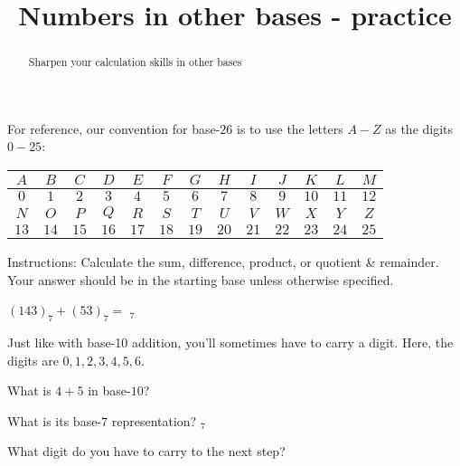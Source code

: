 \documentclass[handout,numbers]{ximera}
\title{Numbers in other bases - practice}
\begin{document}
\begin{abstract} {Sharpen your calculation skills in other bases}
\end{abstract}
\maketitle

For reference, our convention for base-$26$ is to use the letters $A-Z$ as the digits $0-25$:

\begin{center}
\begin{small}
\begin{tabular}{|c|c|c|c|c|c|c|c|c|c|c|c|c|}
\hline
 $A$ & $B$ & $C$ & $D$ & $E$ & $F$ & $G$ & $H$ & $I$ & $J$ & $K$ & $L$ & $M$  \\
 \hline
$0$ & $1$ & $2$ & $3$ & $4$ & $5$ & $6$ & $7$ & $8$ & $9$ & $10$ & $11$ & $12$ \\
\hline
\hline
$N$ & $O$ & $P$ & $Q$ & $R$ & $S$ & $T$ & $U$ & $V$ & $W$ & $X$ & $Y$ & $Z$\\
\hline
$13$ & $14$ & $15$ & $16$ & $17$ & $18$ & $19$ & $20$ & $21$ & $22$ & $23$ & $24$ & $25$ \\
\hline
\end{tabular}
\end{small}
\end{center}

Instructions: Calculate the sum, difference, product, or quotient \& remainder.  Your answer should be in the starting base unless otherwise specified.

\begin{question}
$(143)_7 + (53)_7 = $ \quad {}$_7$

\begin{hint} Just like with base-10 addition, you'll sometimes have to carry a digit.  Here, the digits are $0, 1, 2, 3, 4, 5, 6$.

\begin{prompt} What is $4+5$ in base-$10$? \qquad\qquad {}\end{prompt}

\begin{prompt} What is its base-$7$ representation? \qquad\qquad {}$_7$\end{prompt}

\begin{prompt} What digit do you have to carry to the next step? 
\end{prompt}
\end{hint}


\end{question}
\end{document}
